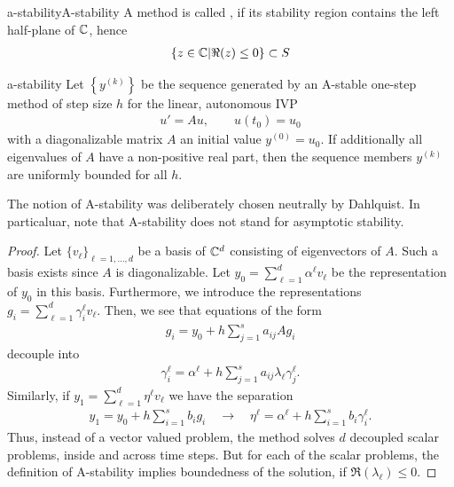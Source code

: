\begin{Definition*}{a-stability}{A-stability}
  A method is called , if its stability region contains
  the left half-plane of $\mathbb C$, hence
  \begin{gather}
    \{ z \in \mathbb C | \Re(z) \le 0 \} \subset S
  \end{gather}
\end{Definition*}

\begin{Theorem}{a-stability}
  Let $\left\{y^{(k)}\right\}$ be the sequence generated by an
  A-stable one-step method of step size $h$ for the linear, autonomous IVP
  \begin{gather*}
    u'=Au, \qquad u(t_0) = u_0
  \end{gather*}
  with a diagonalizable matrix $A$ an initial value $y^{(0)} =
  u_0$. If additionally all eigenvalues of $A$ have a non-positive
  real part, then the sequence members $y^{(k)}$ are uniformly bounded
  for all $h$.
\end{Theorem}

 \begin{remark}
  The notion of A-stability was deliberately chosen neutrally by Dahlquist.
  In particaluar, note that A-stability does not stand for asymptotic stability.
 \end{remark}

\begin{proof}
  Let $\{v_\ell\}_{\ell=1,\dots,d}$ be a basis of $\mathbb C^d$ consisting of
  eigenvectors of $A$. Such a basis exists since $A$ is
  diagonalizable. Let $y_0 = \sum_{\ell=1}^d \alpha^\ell v_\ell$ be
  the representation of $y_0$ in this basis. Furthermore, we introduce
  the representations $g_i = \sum_{\ell=1}^d \gamma_i^\ell
  v_\ell$. Then, we see that equations of the form
  \begin{gather*}
    g_i = y_0 + h \sum_{j=1}^s a_{ij} A g_i
  \end{gather*}
  decouple into
  \begin{gather*}
    \gamma_{i}^\ell = \alpha^\ell + h \sum_{j=1}^s a_{ij} \lambda_\ell \gamma_j^\ell.
  \end{gather*}
  Similarly, if $y_1 = \sum_{\ell=1}^d \eta^\ell v_\ell$ we have the separation
  \begin{gather*}
    y_1 = y_0 + h\sum_{i=1}^s b_i g_i
    \quad\longrightarrow\quad
    \eta^\ell = \alpha^\ell  + h\sum_{i=1}^s b_i \gamma_i^\ell.
  \end{gather*}
  Thus, instead of a vector valued problem, the method solves $d$
  decoupled scalar problems, inside and across time steps. But for each of the scalar problems, the definition of A-stability implies boundedness of the solution, if $\Re(\lambda_\ell) \le 0$.
\end{proof}

